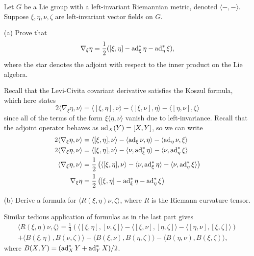 \documentclass{../../templates/lkx_pset}
\begin{document}
\begin{problem}{7}
	Let $G$ be a Lie group with a left-invariant Riemannian metric, denoted $\langle -,-\rangle$. Suppose $\xi,\eta,\nu,\zeta$ are left-invariant vector fields on $G$.
\end{problem}

\begin{parts}
	\begin{part}{(a)}
		Prove that
		\[
		\nabla_\xi \eta = \frac{1}{2}([\xi, \eta] - \operatorname{ad}_\xi^*\eta - \operatorname{ad}_\eta^*\xi),
		\]
		where the star denotes the adjoint with respect to the inner product on the Lie algebra.
	\end{part}

	Recall that the Levi-Civita covariant derivative satisfies the Koszul formula, which here states
	\[
		2\langle \nabla_\xi \eta, \nu\rangle = 
		\langle [\xi, \eta], \nu\rangle - 
		\langle [\xi, \nu], \eta\rangle -
		\langle [\eta, \nu], \xi\rangle
	\]
	since all of the terms of the form $\xi\langle \eta,\nu\rangle$ vanish due to left-invariance. Recall that the adjoint operator behaves as $\operatorname{ad}_X(Y)=[X,Y]$, so we can write
	\[
		\begin{aligned}
		2\langle \nabla_\xi \eta, \nu\rangle 
		&= \langle [\xi, \eta], \nu\rangle - 
		\langle \operatorname{ad}_\xi \nu, \eta\rangle -
	\langle \operatorname{ad}_\eta \nu, \xi\rangle\\
	2\langle \nabla_\xi \eta,\nu\rangle
		&= \langle [\xi,\eta], \nu\rangle - 
		\langle  \nu, \operatorname{ad}_\xi^* \eta\rangle -
	\langle \nu, \operatorname{ad}_\eta^* \xi\rangle\\
	\langle\nabla_\xi \eta, \nu\rangle
		&= \frac{1}{2}\left(\langle [\xi,\eta], \nu\rangle - 
		\langle  \nu, \operatorname{ad}_\xi^* \eta\rangle -
	\langle \nu, \operatorname{ad}_\eta^* \xi\rangle\right)\\
	\nabla_\xi \eta
		&= \frac{1}{2}\left([\xi,\eta] - 
		\operatorname{ad}_\xi^* \eta-
	 \operatorname{ad}_\eta^* \xi\right)\\
		\end{aligned}
\]

\begin{part}{(b)}
	Derive a formula for $\langle R(\xi, \eta)\nu, \zeta\rangle$, where $R$ is the Riemann curvature tensor.
\end{part}
Similar tedious application of formulas as in the last part gives
\[
	\begin{aligned}
	\langle R(\xi,\eta)\nu, \zeta\rangle=\frac{1}{4}\left( 
		\langle [\xi,\eta], [\nu,\zeta]\rangle
		-\langle [\xi,\nu], [\eta,\zeta]\rangle
		-\langle [\eta,\nu], [\xi,\zeta]\rangle
\right)\\
+ \langle B(\xi, \eta), B(\nu,\zeta)\rangle
- \langle B(\xi,\nu), B(\eta,\zeta)\rangle
- \langle B(\eta,\nu), B(\xi, \zeta)\rangle,
\end{aligned}
\]
where $B(X,Y) = (\operatorname{ad}_X^* Y + \operatorname{ad}_Y^* X)/2$.


\end{parts}
\end{document}
